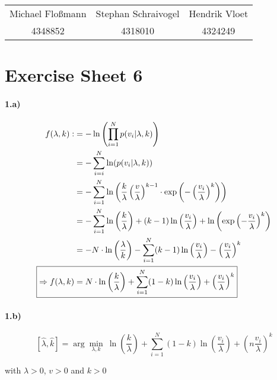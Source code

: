 \documentclass[12pt, a4paper]{scrartcl}
\newcommand{\argmin}{\arg\!\min}
\begin{document}
\begin{table}[!h]
  \centering
  \begin{tabular}{c|c|c}
    Michael Floßmann & Stephan Schraivogel & Hendrik Vloet \\ %
    4348852 & 4318010 & 4324249
  \end{tabular}
\end{table}
\section*{Exercise Sheet 6}
\paragraph{1.a)}
\begin{align*}
  f(\lambda,k):&= -\ln
  \left(
    \prod^N_{i=1}p(v_i|\lambda,k)
  \right) \\
  &= -\sum^N_{i=i}\ln(p(v_i|\lambda,k)) \\
  &= -\sum^N_{i=1}\ln
  \left(
    \frac{k}{\lambda}
    \left(
      \frac{v}{\lambda}
    \right)^{k-1} \cdot 
    \exp
    \left(-
      \left(
        \frac{v_i}{\lambda}
      \right)^k
      \right)
  \right) \\
  &= -\sum^N_{i=1}\ln
  \left(
    \frac{k}{\lambda}
  \right)
  + (k-1)\ln
  \left(
\frac{v_i}{\lambda}
  \right) + \ln
  \left(
    \exp
    \left(
      -\frac{v_i}{\lambda}
    \right)^k
  \right) \\
  &=-N\cdot\ln
  \left(
    \frac{\lambda}{k}
  \right)-\sum^N_{i=1}(k-1)\ln
  \left(
    \frac{v_i}{\lambda}
  \right) -
  \left(
    \frac{v_i}{\lambda}
  \right)^k \\
\Aboxed{\Rightarrow f(\lambda,k) &= N\cdot\ln
  \left(
    \frac{k}{\lambda}
  \right)+\sum^N_{i=1}(1-k)\ln
  \left(
    \frac{v_i}{\lambda}
  \right) +
  \left(
    \frac{v_i}{\lambda}
  \right)^k}
\end{align*}

\paragraph{1.b)}
\[\boxed{
    [\hat{\lambda},\hat{k}]=\argmin_{\lambda,k}\ \ln
    \left(
      \frac{k}{\lambda}
    \right)
    + \sum^N_{i=1}(1-k)\ln
\left(
  \frac{v_i}{\lambda}
\right)+
\left(n
  \frac{v_i}{\lambda}
\right)^k
}\]
\begin{center}
with $\lambda > 0$, $v>0$ and $k>0$
\end{center}
\end{document}
